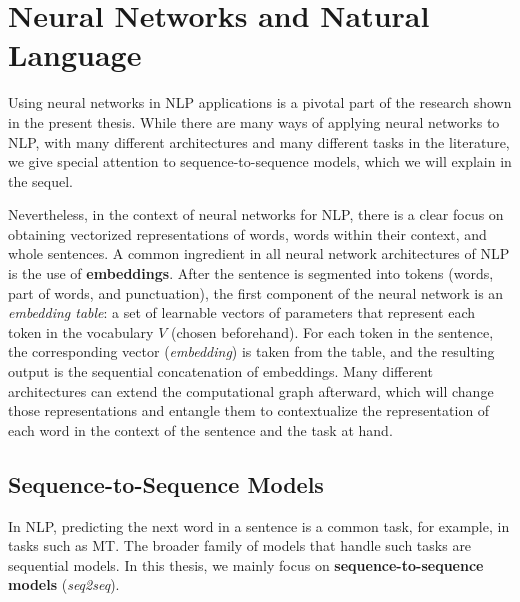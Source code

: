 
\section{Neural Networks and Natural Language}

\noindent Using neural networks in NLP applications is a pivotal part
of the research shown in the present thesis. While there are many
ways of applying neural networks to NLP, with many different
architectures and many different tasks in the literature, we give
special attention to sequence-to-sequence models, which we will
explain in the sequel.

Nevertheless, in the context of neural networks for NLP, there is a
clear focus on obtaining vectorized representations of words, words
within their context, and whole sentences. A common ingredient in all
neural network architectures of NLP is the use of
\textbf{embeddings}. After the sentence is segmented into tokens
(words, part of words, and punctuation), the first component of the
neural network is an \textit{embedding table}: a set of learnable
vectors of parameters that represent each token in the vocabulary $V$
(chosen beforehand). For each token in the sentence, the
corresponding vector (\textit{embedding}) is taken from the table,
and the resulting output is the sequential concatenation of
embeddings. Many different architectures can extend the computational
graph afterward, which will change those representations and entangle
them to contextualize the representation of each word in the context
of the sentence and the task at hand.

\subsection{Sequence-to-Sequence Models}

\noindent In NLP, predicting the next word in a sentence is a common
task, for example, in tasks such as MT. The
broader family of models that handle such tasks are sequential
models. In this thesis, we mainly focus on
\textbf{sequence-to-sequence models} (\textit{seq2seq}).

